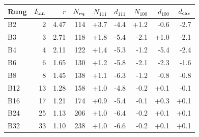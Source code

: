 \begin{tabular}{lrrrrrrrr}
\toprule
Rung & $I_{\rm bin}$ & $r$ & $N_{\rm eq}$ & $N_{111}$ & $d_{111}$ & $N_{100}$ & $d_{100}$ & $d_{\rm cav}$ \\
\midrule
B2 & 2 & 4.47 & 114 & +3.7 & -4.4 & +1.2 & -0.6 & -2.7 \\
B3 & 3 & 2.71 & 118 & +1.8 & -5.4 & -2.1 & +1.0 & -2.1 \\
B4 & 4 & 2.11 & 122 & +1.4 & -5.3 & -1.2 & -5.4 & -2.4 \\
B6 & 6 & 1.65 & 130 & +1.2 & -5.8 & -2.1 & -2.3 & -1.6 \\
B8 & 8 & 1.45 & 138 & +1.1 & -6.3 & -1.2 & -0.8 & -0.8 \\
B12 & 13 & 1.28 & 158 & +1.0 & -4.8 & -0.2 & +0.1 & -0.1 \\
B16 & 17 & 1.21 & 174 & +0.9 & -5.4 & -0.1 & +0.3 & +0.1 \\
B24 & 25 & 1.13 & 206 & +1.0 & -6.4 & -0.2 & +0.1 & +0.1 \\
B32 & 33 & 1.10 & 238 & +1.0 & -6.6 & -0.2 & +0.1 & +0.1 \\
\bottomrule
\end{tabular}
